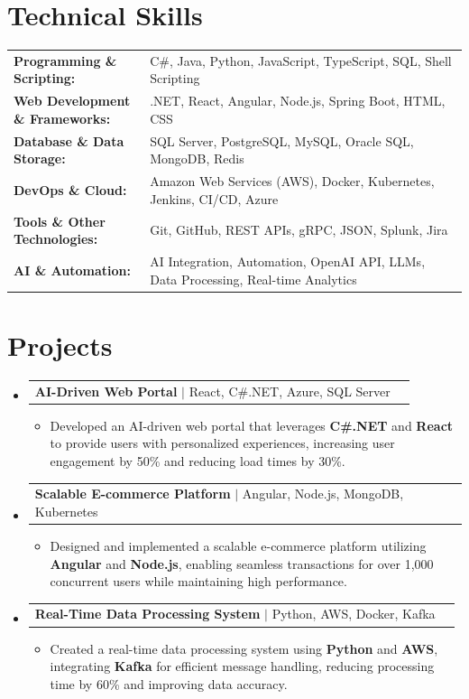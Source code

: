 \documentclass[letterpaper,10pt]{article}
\makeatletter
\newcommand{\resumeItem}[1]{
  \item{\fontsize{8pt}{9pt}\selectfont
    #1 \vspace{-3pt}
  }
}
\newcommand{\resumeProjectHeading}[2]{
    \item
    \begin{tabular*}{1.001\textwidth}{l@{\extracolsep{\fill}}r}
      \fontsize{8.5pt}{10pt}#1 & \textbf{\fontsize{8.5pt}{10pt} #2}\\
    \end{tabular*}\vspace{-7pt}
}
\newcommand{\resumeSubHeadingListStart}{\begin{itemize}[leftmargin=0pt, label={}]}
\newcommand{\resumeSubHeadingListEnd}{\end{itemize}}
\newcommand{\resumeItemListStart}{\begin{itemize}[leftmargin=*]}
\newcommand{\resumeItemListEnd}{\end{itemize}\vspace{-5pt}}
\makeatother
\begin{document}
\section{Technical Skills}
        \vspace{-14pt}
        \begin{table}[h]
            \fontsize{8pt}{9pt}\selectfont
            \begin{tabular}{p{0.3\linewidth} p{0.7\linewidth}}
                \textbf{Programming \& Scripting:} & C\#, Java, Python, JavaScript, TypeScript, SQL, Shell Scripting \\
                \textbf{Web Development \& Frameworks:} & .NET, React, Angular, Node.js, Spring Boot, HTML, CSS \\
                \textbf{Database \& Data Storage:} & SQL Server, PostgreSQL, MySQL, Oracle SQL, MongoDB, Redis \\
                \textbf{DevOps \& Cloud:} & Amazon Web Services (AWS), Docker, Kubernetes, Jenkins, CI/CD, Azure \\
                \textbf{Tools \& Other Technologies:} & Git, GitHub, REST APIs, gRPC, JSON, Splunk, Jira \\
                \textbf{AI \& Automation:} & AI Integration, Automation, OpenAI API, LLMs, Data Processing, Real-time Analytics \\
            \end{tabular}
        \end{table}
 \vspace{-18pt}

\section{Projects}
    \vspace{-5pt}
    \resumeSubHeadingListStart
          \resumeProjectHeading
            {\textbf{AI-Driven Web Portal} $|$ React, C#.NET, Azure, SQL Server}{}
            \resumeItemListStart
                \resumeItem{Developed an AI-driven web portal that leverages \textbf{C#.NET} and \textbf{React} to provide users with personalized experiences, increasing user engagement by 50\% and reducing load times by 30\%.}
            \resumeItemListEnd
        \vspace{-12pt}
    
        \resumeProjectHeading
            {\textbf{Scalable E-commerce Platform} $|$ Angular, Node.js, MongoDB, Kubernetes}{}
        \resumeItemListStart
                \resumeItem{Designed and implemented a scalable e-commerce platform utilizing \textbf{Angular} and \textbf{Node.js}, enabling seamless transactions for over 1,000 concurrent users while maintaining high performance.}
        \resumeItemListEnd
      \vspace{-12pt}
      \resumeProjectHeading
        {\textbf{Real-Time Data Processing System} $|$ Python, AWS, Docker, Kafka}{}
    \resumeItemListStart
            \resumeItem{Created a real-time data processing system using \textbf{Python} and \textbf{AWS}, integrating \textbf{Kafka} for efficient message handling, reducing processing time by 60\% and improving data accuracy.}
    \resumeItemListEnd
    \resumeSubHeadingListEnd
\end{document}
